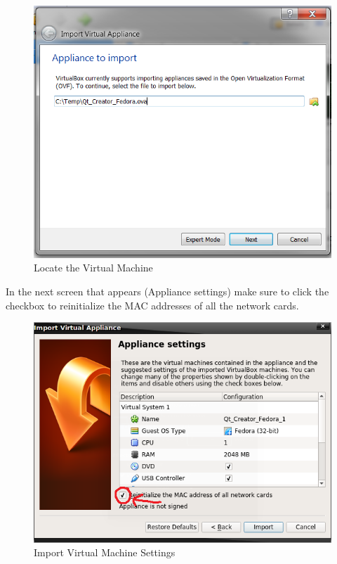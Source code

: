 \documentclass{article}
\begin{document}
	\begin{figure}[H]
		\centering
		\includegraphics[scale=0.75]{pics/VirtualBox_VM_Location.png}
		\caption{Locate the Virtual Machine}
		\label{Locate_Virtual_Machine}
	\end{figure}


In the next screen that appears (Appliance settings) make sure to click the checkbox to reinitialize the MAC addresses of all the network cards.


	\begin{figure}[H]
		\centering
		\includegraphics[scale=0.75]{pics/VirtualBox_Appliance_Settings.png}
		\caption{Import Virtual Machine Settings}
		\label{Import_Virtual_Machine_Settings}
	\end{figure}
\end{document}
